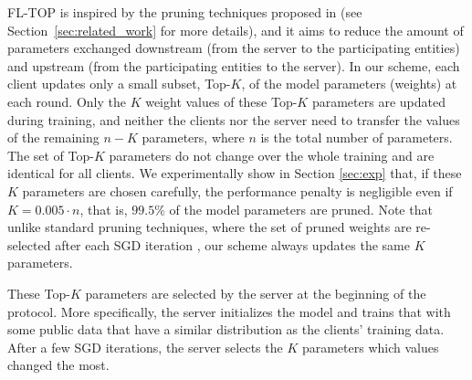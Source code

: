 \documentclass[accepted]{uai2021} %
\newcommand{\TOPK}{Top-$K$\xspace}
\begin{document}


FL-TOP is inspired by the pruning techniques proposed in \cite{dsd} (see Section~\ref{sec:related_work} for more details), and it aims to reduce the amount of parameters exchanged downstream (from the server to the participating entities) and upstream (from the participating entities to the server).  In our scheme, each client updates only a small subset, \TOPK, of the model parameters (weights) at each round. Only the $K$ weight values of these \TOPK parameters are updated during training, and neither the clients nor the server need to transfer the values of the remaining $n-K$ parameters, where $n$ is the total number of parameters. The set of \TOPK parameters do not change over the whole training and are identical for all clients. 
We experimentally show in Section \ref{sec:exp} that, if these $K$ parameters are chosen carefully, the performance penalty is negligible even if $K = 0.005 \cdot n$, that is, $99.5\%$ of the model parameters are pruned. Note that unlike standard pruning techniques, where the set of pruned weights are re-selected after each SGD iteration \citep{dsd}, our scheme always updates the same $K$ parameters.

These \TOPK parameters are selected by the server at the beginning of the protocol. More specifically, the server initializes the model and trains
that with some public data that have a similar distribution as the clients' training data. After a few SGD iterations, the server selects the $K$ parameters which values changed the most.



\end{document}
